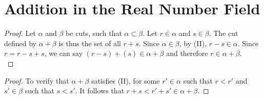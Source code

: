 \documentclass[12pt]{article}
\begin{document}
\section{Addition in the Real Number Field}
\begin{proof}
Let $\alpha$ and $\beta$ be cuts, such that $\alpha\subset\beta$. 
Let $r\in\alpha$ and $s\in\beta$. The cut defined by $\alpha+\beta$ is thus the set of all $r+s$. 
Since $\alpha\in\beta$, by (II), $r-s\in\alpha$. Since $r=r-s+s$, we can say $(r-s)+(s)
\in\alpha+\beta$ and therefore $r\in\alpha+\beta$.\\
\end{proof}

\begin{proof}
To verify that $\alpha + \beta$ satisfies (II), for some $r' \in \alpha$ such that $r < r'$ and 
$s' \in \beta$ such that $s < s'$. It follows that $r + s < r' + s' \in \alpha + \beta$.
\end{proof}
\end{document}
